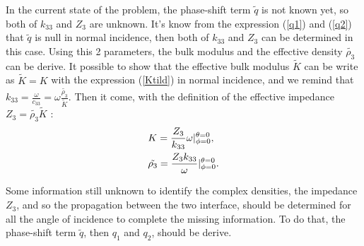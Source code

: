 \documentclass{article}
\begin{document}
    In the current state of the problem, the phase-shift term $\tilde{q}$ is not known yet, so both of $k_{33}$ and $Z_3$ are unknown. It's know from the expression (\ref{q1}) and (\ref{q2}) that $\tilde{q}$ is null in normal incidence, then both of $k_{33}$ and $Z_3$ can be determined in this case. 
    Using this 2 parameters, the bulk modulus and the effective density $\tilde{\rho_3}$ can be derive. It possible to show that the effective bulk modulus $\tilde{K}$ can be write as $\tilde{K}=K$ with the expression (\ref{Ktild}) in normal incidence, and we remind that $k_{33}=\frac{\omega}{c_{33}}=\omega\frac{\tilde{\rho_3}}{\tilde{K}}$. Then it come, with the definition of the effective impedance $Z_3=\tilde{\rho_3}\tilde{K}$ :
    \begin{align}
        &K=\frac{Z_3}{k_{33}}\omega\Large{|}^{\theta=0}_{\phi=0},\\
        &\tilde{\rho_3}=\frac{Z_3k_{33}}{\omega}\Large{|}^{\theta=0}_{\phi=0}.
    \end{align}
    
    Some information still unknown to identify the complex densities, the impedance $Z_3$, and so the propagation between the two interface, should be determined for all the angle of incidence to complete the missing information. To do that, the phase-shift term $\tilde{q}$, then $q_1$ and $q_2$, should be derive. 
    
\end{document}
